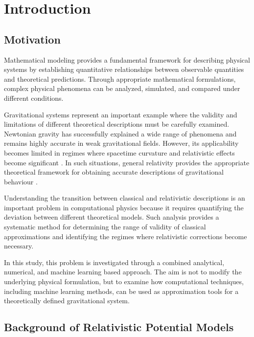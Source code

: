 \documentclass[
]{article}
\begin{document}
\tableofcontents
\newpage

\section{Introduction}\label{introduction}

\subsection{Motivation}\label{motivation}

Mathematical modeling provides a fundamental framework for describing
physical systems by establishing quantitative relationships between
observable quantities and theoretical predictions. Through appropriate
mathematical formulations, complex physical phenomena can be analyzed,
simulated, and compared under different conditions.

Gravitational systems represent an important example where the validity
and limitations of different theoretical descriptions must be carefully
examined. Newtonian gravity has successfully explained a wide range of
phenomena and remains highly accurate in weak gravitational fields.
However, its applicability becomes limited in regimes where spacetime
curvature and relativistic effects become significant
\cite{newton1687}. In such situations, general relativity provides the
appropriate theoretical framework for obtaining accurate descriptions of
gravitational behaviour \cite{einstein1916}.

Understanding the transition between classical and relativistic
descriptions is an important problem in computational physics because it
requires quantifying the deviation between different theoretical
models. Such analysis provides a systematic method for determining the
range of validity of classical approximations and identifying the
regimes where relativistic corrections become necessary.

In this study, this problem is investigated through a combined
analytical, numerical, and machine learning based approach. The aim is
not to modify the underlying physical formulation, but to examine how
computational techniques, including machine learning methods, can be
used as approximation tools for a theoretically defined gravitational
system.

\subsection{Background of Relativistic Potential
Models}\label{background-of-relativistic-potential-models}
\end{document}
